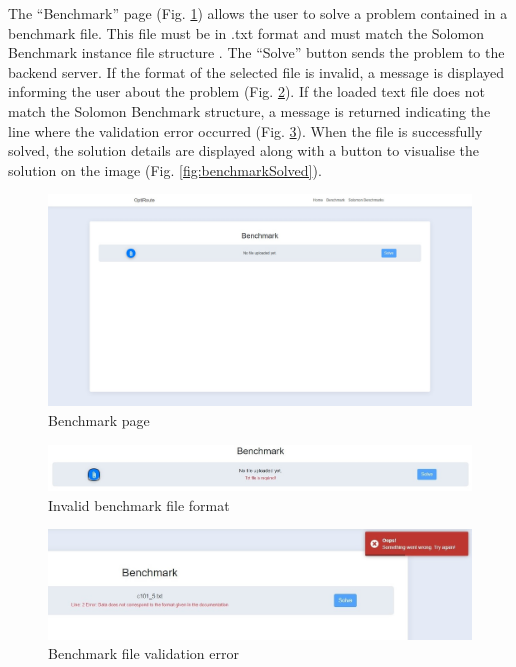 \documentclass[a4paper,twoside,12pt]{book}
\begin{document}
The ``Benchmark'' page (Fig. \ref{fig:benchmark}) allows the user to solve a problem contained in a benchmark file. This file must be in .txt format and must match the Solomon Benchmark instance file structure \cite{bib:sintefDocumentation}. The ``Solve'' button sends the problem to the backend server. If the format of the selected file is invalid, a message is displayed informing the user about the problem (Fig. \ref{fig:benchmarkInvalidFormat}). If the loaded text file does not match the Solomon Benchmark structure, a message is returned indicating the line where the validation error occurred (Fig. \ref{fig:benchmarkInvalidFile}). When the file is successfully solved, the solution details are displayed along with a button to visualise the solution on the image (Fig. \ref{fig:benchmarkSolved}).

\begin{figure}[htbp]
\centering
\includegraphics[width=\textwidth]{images/benchmark.jpg}
\caption{Benchmark page}
\label{fig:benchmark}
\end{figure}

\begin{figure}[htbp]
\centering
\includegraphics[width=\textwidth]{images/benchmarkInvalidFormat_updated.jpg}
\caption{Invalid benchmark file format}
\label{fig:benchmarkInvalidFormat}
\end{figure}

\begin{figure}[htbp]
\centering
\includegraphics[width=\textwidth]{images/benchmarkInvalidFile_updated.jpg}
\caption{Benchmark file validation error}
\label{fig:benchmarkInvalidFile}
\end{figure}
\end{document}
